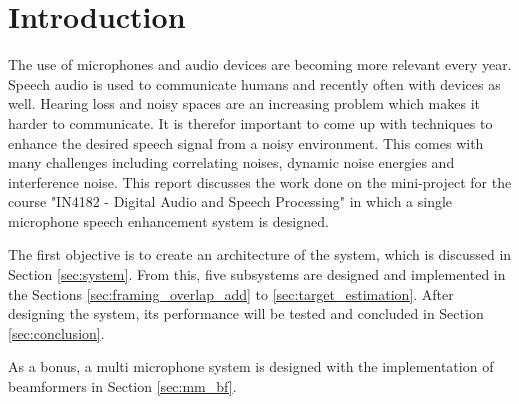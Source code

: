 \section{Introduction} \label{sec:introduction}
The use of microphones and audio devices are becoming more relevant every year. Speech audio is used to communicate humans and recently often with devices as well. Hearing loss and noisy spaces are an increasing problem which makes it harder to communicate. It is therefor important to come up with techniques to enhance the desired speech signal from a noisy environment. This comes with many challenges including correlating noises, dynamic noise energies and interference noise. This report discusses the work done on the mini-project for the course "IN4182 - Digital Audio and Speech Processing" in which a single microphone speech enhancement system is designed.

The first objective is to create an architecture of the system, which is discussed in Section \ref{sec:system}. From this, five subsystems are designed and implemented in the Sections \ref{sec:framing_overlap_add} to \ref{sec:target_estimation}. After designing the system, its performance will be tested and concluded in Section \ref{sec:conclusion}.

As a bonus, a multi microphone system is designed with the implementation of beamformers in Section \ref{sec:mm_bf}.
